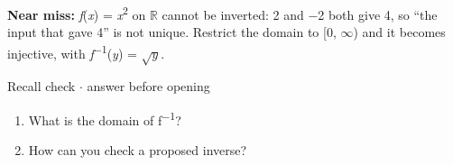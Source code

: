\documentclass[11pt]{article}
\begin{document}
\begin{keepsection}
\begin{notebox}\textbf{Near miss:} \textit{f}(\textit{x}) = \textit{x}\textsuperscript{2} on \ensuremath{\mathbb{R}} cannot be inverted: 2 and \ensuremath{-}2 both give 4, so “the input that gave 4” is not unique. Restrict the domain to [0, \ensuremath{\infty}) and it becomes injective, with \textit{f}\textsuperscript{\ensuremath{-}1}(\textit{y}) = \ensuremath{\sqrt{{y}}}.\end{notebox}

\begin{recallbox}{Recall check \ensuremath{\cdot} answer before opening}
\begin{enumerate}
\item What is the domain of f\textsuperscript{\ensuremath{-}1}?
\item How can you check a proposed inverse?
\end{enumerate}

\end{recallbox}
\end{keepsection}
\end{document}
